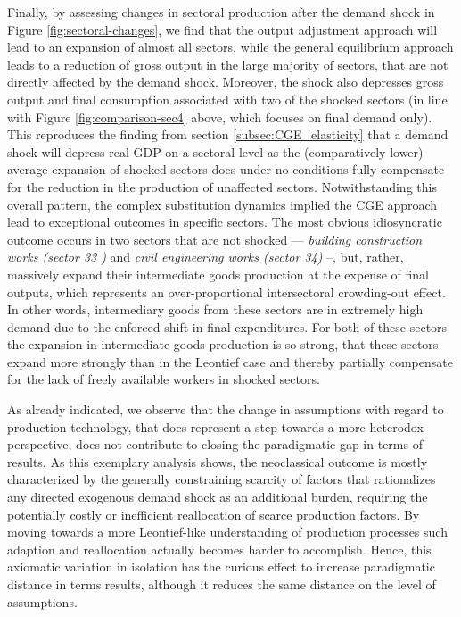 Finally, by assessing changes in sectoral production after the demand shock in Figure \ref{fig:sectoral-changes}, we find that the output adjustment approach will lead to an expansion of almost all sectors, while the general equilibrium approach leads to a reduction of gross output in the large majority of sectors, that are not directly affected by the demand shock. Moreover, the shock also depresses gross output and final consumption associated with two of the shocked sectors (in line with Figure \ref{fig:comparison-sec4} above, which focuses on final demand only). This reproduces the finding from section \ref{subsec:CGE_elasticity} that a demand shock will depress real GDP on a sectoral level as the (comparatively lower) average expansion of shocked sectors does under no conditions fully compensate for the reduction in the production of unaffected sectors. Notwithstanding this overall pattern, the complex substitution dynamics implied the CGE approach lead to exceptional outcomes in specific sectors. The most obvious idiosyncratic outcome occurs in two sectors that are not shocked –– \textit{building construction works (sector 33 )} and \textit{civil engineering works (sector 34)} --, but, rather, massively expand their intermediate goods production at the expense of final outputs, which represents an over-proportional intersectoral crowding-out effect. In other words, intermediary goods from these sectors are in extremely high demand due to the enforced shift in final expenditures. For both of these sectors the expansion in intermediate goods production is so strong, that these sectors expand more strongly than in the Leontief case and thereby partially compensate for the lack of freely available workers in shocked sectors.

As already indicated, we observe that the change in assumptions with regard to production technology, that does represent a step towards a more heterodox perspective, does not contribute to closing the paradigmatic gap in terms of results. As this exemplary analysis shows, the neoclassical outcome is mostly characterized by the generally constraining scarcity of factors that rationalizes any directed exogenous demand shock as an additional burden, requiring the potentially costly or inefficient reallocation of scarce production factors. By moving towards a more Leontief-like understanding of production processes such adaption and reallocation actually becomes harder to accomplish. Hence, this axiomatic variation in isolation has the curious effect to increase paradigmatic distance in terms results, although it reduces the same distance on the level of assumptions.

